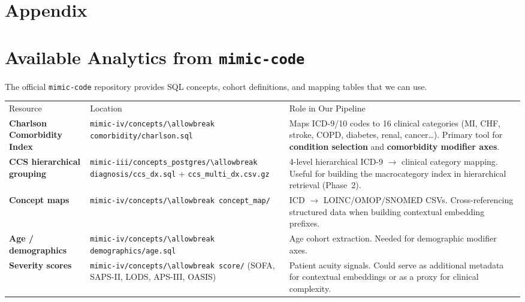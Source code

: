 \documentclass[11pt,a4paper]{article}
\newcommand{\field}[1]{\nolinkurl{#1}}
\newcommand{\mr}{\specialrule{0.4pt}{4pt}{4pt}}
\begin{document}
\appendix
\section*{Appendix}

\section{Available Analytics from \texttt{mimic-code}}
\label{sec:mimic-code}

The official \texttt{mimic-code} repository provides SQL concepts, cohort definitions, and mapping tables that we can use.

\begin{center}
	\small
	\begin{tabular}{p{4.2cm}p{5.4cm}p{6cm}}
		Resource                                                       & Location & Role in Our Pipeline \\
		\mr
		\textbf{Charlson Comorbidity Index}                            &
		\field{mimic-iv/concepts/\allowbreak comorbidity/charlson.sql} &
		Maps ICD-9/10 codes to 16 clinical categories (MI, CHF, stroke, COPD,
		diabetes, renal, cancer\ldots).  Primary tool for \textbf{condition
		selection} and \textbf{comorbidity modifier axes}.                                               \\
		\addlinespace
		\textbf{CCS hierarchical grouping}                             &
		\field{mimic-iii/concepts\_postgres/\allowbreak diagnosis/ccs\_dx.sql}
		+ \field{ccs\_multi\_dx.csv.gz}                                &
		4-level hierarchical ICD-9 $\to$ clinical category mapping.
		Useful for building the macrocategory index in hierarchical retrieval
		(Phase~2).                                                                                       \\
		\addlinespace
		\textbf{Concept maps}                                          &
		\field{mimic-iv/concepts/\allowbreak concept\_map/}            &
		ICD $\to$ LOINC/OMOP/SNOMED CSVs.  Cross-referencing structured data
		when building contextual embedding prefixes.                                                     \\
		\addlinespace
		\textbf{Age / demographics}                                    &
		\field{mimic-iv/concepts/\allowbreak demographics/age.sql}     &
		Age cohort extraction.  Needed for demographic modifier axes.                                    \\
		\addlinespace
		\textbf{Severity scores}                                       &
		\field{mimic-iv/concepts/\allowbreak score/} (SOFA, SAPS-II, LODS,
		APS-III, OASIS)                                                &
		Patient acuity signals.  Could serve as additional metadata for
		contextual embeddings or as a proxy for clinical complexity.                                     \\
	\end{tabular}
\end{center}
\end{document}
